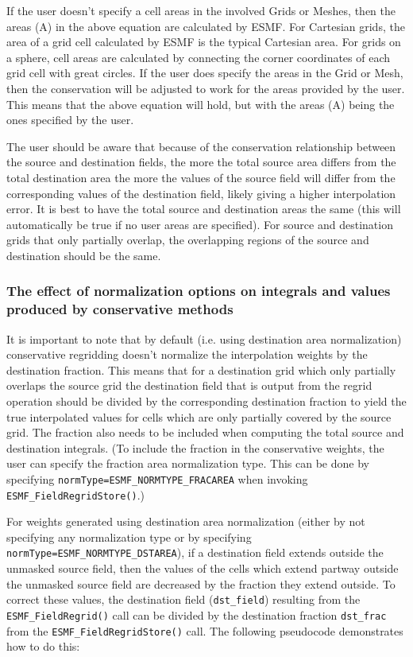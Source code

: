  If the user doesn't specify a cell areas in the involved Grids or Meshes, then the areas (A) in the above equation are calculated by ESMF. 
 For Cartesian grids, the area of a grid cell calculated by ESMF is the typical Cartesian area. 
 For grids on a sphere, cell areas are calculated by connecting the corner coordinates of each grid cell with great circles. If the user 
 does specify the areas in the Grid or Mesh, then the conservation will be adjusted to work for the areas 
 provided by the user. This means that the above equation will hold, but with the areas (A) being the ones specified by the user.

 The user should be aware that because of the conservation relationship between the source and destination fields, the more the total source area
 differs from the total destination area the more the values of the source field will differ from the corresponding values of the destination field, 
 likely giving a higher interpolation error. It is best to have the total source and destination areas the same 
 (this will automatically be true if no user areas are specified). For source and destination grids 
 that only partially overlap, the overlapping regions of the source and destination should be the same.

\subsubsection{The effect of normalization options on integrals and values produced by conservative methods}\label{sec:interpolation:conservative_norm_opts}
 It is important to note that by default (i.e. using destination area normalization) 
conservative regridding doesn't normalize the interpolation weights by the destination fraction. 
This means that for a destination grid which only partially overlaps the source grid
the destination field that is output from the regrid operation 
should be divided by the corresponding destination fraction to yield the 
true interpolated values for cells which are only partially covered by the source grid. 
The fraction also needs to be included when computing the total source and destination integrals. 
(To include the fraction in the conservative weights, the user can specify 
the fraction area normalization type. This can be done by specifying {\tt normType=ESMF\_NORMTYPE\_FRACAREA} when
invoking {\tt ESMF\_FieldRegridStore()}.)

For weights generated using destination area normalization (either by not specifying any normalization type or by specifying {\tt normType=ESMF\_NORMTYPE\_DSTAREA}), if a destination field extends 
outside the unmasked source field, then the values of the cells which 
extend partway outside the unmasked source field are decreased by the fraction they extend outside. 
To correct these values, the destination field ({\tt dst\_field}) resulting
from the {\tt ESMF\_FieldRegrid()} call can be divided by the destination fraction {\tt dst\_frac} 
from the {\tt ESMF\_FieldRegridStore()} call. The following pseudocode demonstrates  how to do this:

